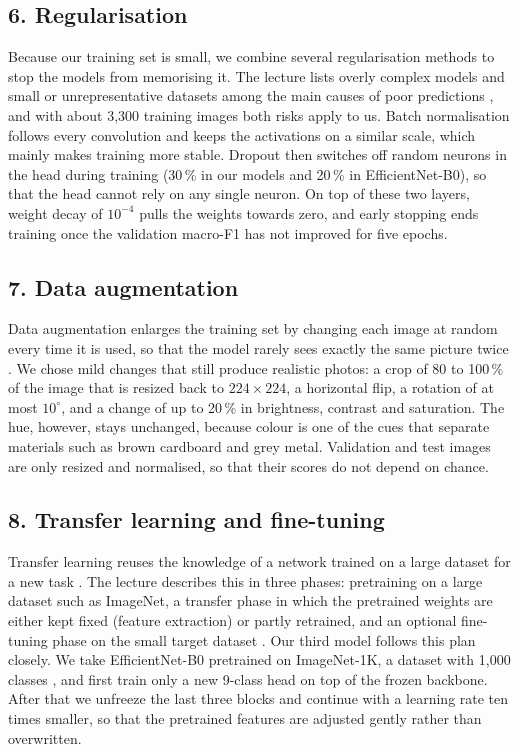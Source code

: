 \documentclass{article}
\begin{document}
\subsection{6. Regularisation}

Because our training set is small, we combine several regularisation methods to stop the models from memorising it. The lecture lists overly complex models and small or unrepresentative datasets among the main causes of poor predictions \cite{lec53}, and with about 3,300 training images both risks apply to us. Batch normalisation \cite{batchnorm, lec52} follows every convolution and keeps the activations on a similar scale, which mainly makes training more stable. Dropout \cite{dropout} then switches off random neurons in the head during training (30\,\% in our models and 20\,\% in EfficientNet-B0), so that the head cannot rely on any single neuron. On top of these two layers, weight decay of $10^{-4}$ pulls the weights towards zero, and early stopping ends training once the validation macro-F1 has not improved for five epochs.

\subsection{7. Data augmentation}

Data augmentation enlarges the training set by changing each image at random every time it is used, so that the model rarely sees exactly the same picture twice \cite{lec53}. We chose mild changes that still produce realistic photos: a crop of 80 to 100\,\% of the image that is resized back to $224\times224$, a horizontal flip, a rotation of at most $10^\circ$, and a change of up to 20\,\% in brightness, contrast and saturation. The hue, however, stays unchanged, because colour is one of the cues that separate materials such as brown cardboard and grey metal. Validation and test images are only resized and normalised, so that their scores do not depend on chance.

\subsection{8. Transfer learning and fine-tuning}

Transfer learning reuses the knowledge of a network trained on a large dataset for a new task \cite{lec53}. The lecture describes this in three phases: pretraining on a large dataset such as ImageNet, a transfer phase in which the pretrained weights are either kept fixed (feature extraction) or partly retrained, and an optional fine-tuning phase on the small target dataset \cite{lec53}. Our third model follows this plan closely. We take EfficientNet-B0 pretrained on ImageNet-1K, a dataset with 1,000 classes \cite{imagenet}, and first train only a new 9-class head on top of the frozen backbone. After that we unfreeze the last three blocks and continue with a learning rate ten times smaller, so that the pretrained features are adjusted gently rather than overwritten.
\end{document}
